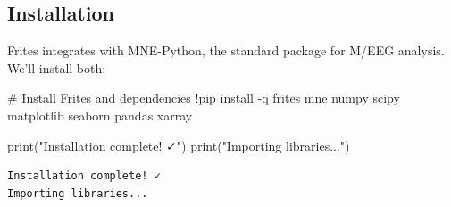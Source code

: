 \documentclass[
  11pt,
  letterpaper,
  oneside,
  openany]{book}
\newenvironment{Shaded}{\begin{snugshade}}{\end{snugshade}}
\newcommand{\BuiltInTok}[1]{\textcolor[rgb]{0.00,0.23,0.31}{#1}}
\newcommand{\CommentTok}[1]{\textcolor[rgb]{0.37,0.37,0.37}{#1}}
\newcommand{\NormalTok}[1]{\textcolor[rgb]{0.00,0.23,0.31}{#1}}
\newcommand{\OperatorTok}[1]{\textcolor[rgb]{0.37,0.37,0.37}{#1}}
\newcommand{\StringTok}[1]{\textcolor[rgb]{0.13,0.47,0.30}{#1}}
\begin{document}
\subsection{Installation}\label{installation}

Frites integrates with MNE-Python, the standard package for M/EEG
analysis. We'll install both:

\begin{Shaded}
\begin{Highlighting}[]
\CommentTok{\# Install Frites and dependencies}
\OperatorTok{!}\NormalTok{pip install }\OperatorTok{{-}}\NormalTok{q frites mne numpy scipy matplotlib seaborn pandas xarray}

\BuiltInTok{print}\NormalTok{(}\StringTok{"Installation complete! ✓"}\NormalTok{)}
\BuiltInTok{print}\NormalTok{(}\StringTok{"Importing libraries..."}\NormalTok{)}
\end{Highlighting}
\end{Shaded}

\begin{verbatim}
Installation complete! ✓
Importing libraries...
\end{verbatim}
\end{document}
